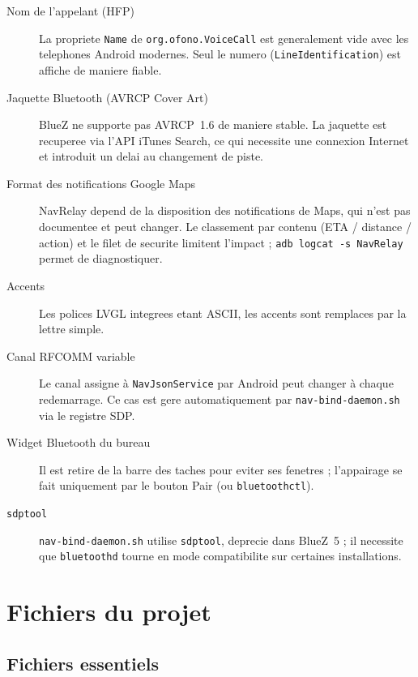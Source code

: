 \documentclass[a4paper,11pt]{article}
\begin{document}
\begin{description}
  \item[Nom de l'appelant (HFP)]
    La propriete \texttt{Name} de \texttt{org.ofono.VoiceCall} est generalement vide
    avec les telephones Android modernes. Seul le numero (\texttt{LineIdentification})
    est affiche de maniere fiable.
  \item[Jaquette Bluetooth (AVRCP Cover Art)]
    BlueZ ne supporte pas AVRCP~1.6 de maniere stable. La jaquette est recuperee via
    l'API iTunes Search, ce qui necessite une connexion Internet et introduit un
    delai au changement de piste.
  \item[Format des notifications Google Maps]
    NavRelay depend de la disposition des notifications de Maps, qui n'est pas documentee
    et peut changer. Le classement par contenu (ETA / distance / action) et le filet de
    securite limitent l'impact ; \texttt{adb logcat -s NavRelay} permet de diagnostiquer.
  \item[Accents]
    Les polices LVGL integrees etant ASCII, les accents sont remplaces par la lettre simple.
  \item[Canal RFCOMM variable]
    Le canal assigne à \texttt{NavJsonService} par Android peut changer à chaque
    redemarrage. Ce cas est gere automatiquement par \texttt{nav-bind-daemon.sh}
    via le registre SDP.
  \item[Widget Bluetooth du bureau]
    Il est retire de la barre des taches pour eviter ses fenetres ; l'appairage se fait
    uniquement par le bouton Pair (ou \texttt{bluetoothctl}).
  \item[\texttt{sdptool}]
    \texttt{nav-bind-daemon.sh} utilise \texttt{sdptool}, deprecie dans BlueZ~5 ; il necessite
    que \texttt{bluetoothd} tourne en mode compatibilite sur certaines installations.
\end{description}

\section{Fichiers du projet}

\subsection{Fichiers essentiels}
\end{document}
